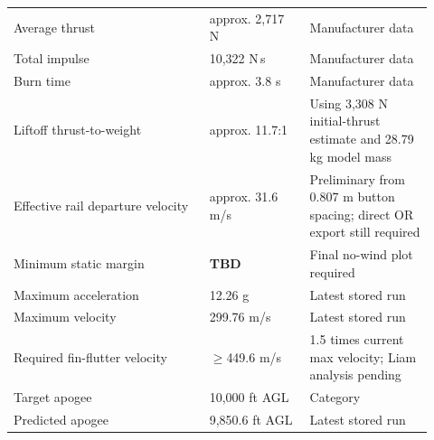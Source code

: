 \documentclass[10pt]{article}
\newcommand{\TBD}{\textbf{TBD}}
\begin{document}
\begin{longtable}{@{}p{0.43\linewidth}p{0.22\linewidth}p{0.27\linewidth}@{}}
Average thrust & approx. 2,717 N & Manufacturer data \\
Total impulse & 10,322 N\,s & Manufacturer data \\
Burn time & approx. 3.8 s & Manufacturer data \\
Liftoff thrust-to-weight & approx. 11.7:1 & Using 3,308 N initial-thrust estimate and 28.79 kg model mass \\
Effective rail departure velocity & approx. 31.6 m/s & Preliminary from 0.807 m button spacing; direct OR export still required \\
Minimum static margin & \TBD & Final no-wind plot required \\
Maximum acceleration & 12.26 g & Latest stored run \\
Maximum velocity & 299.76 m/s & Latest stored run \\
Required fin-flutter velocity & $\ge$449.6 m/s & 1.5 times current max velocity; Liam analysis pending \\
Target apogee & 10,000 ft AGL & Category \\
Predicted apogee & 9,850.6 ft AGL & Latest stored run \\
\bottomrule
\end{longtable}
\end{document}
